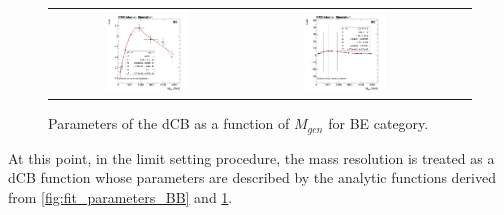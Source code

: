 \begin{figure}[ht]
\begin{center}
\begin{tabular}{cccc}
      \includegraphics[width=0.45\textwidth]{figures/Zprime/2017/mass_resolution/High_Mass/BE_CutL} &
      \includegraphics[width=0.45\textwidth]{figures/Zprime/2017/mass_resolution/High_Mass/BE_CutR} \\
    \end{tabular}
    \caption{Parameters of the dCB as a function of $M_{gen}$ for BE category.
    \label{fig:fit_parameters_BE}}
  \end{center}
\end{figure}

At this point, in the limit setting procedure, the mass resolution is treated as a dCB function whose parameters are described by the analytic functions derived from \ref{fig:fit_parameters_BB} and \ref{fig:fit_parameters_BE}.

